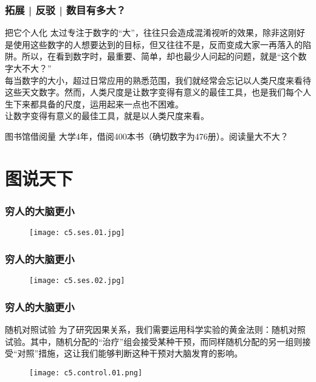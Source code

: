 \begin{frame}
  \frametitle{拓展 | 反驳 | 数目有多大？}
  \begin{block}{把它个人化}
  太过专注于数字的“大”，往往只会造成混淆视听的效果，除非这刚好是使用这些数字的人想要达到的目标，但又往往不是，反而变成大家一再落入的陷阱。所以，在看到数字时，最重要、简单，却也最少人问起的问题，就是“这个数字大不大？”\\
  \vspace{0.5em}
  每当数字的大小，超过日常应用的熟悉范围，我们就经常会忘记以人类尺度来看待这些天文数字。然而，\alert{人类尺度是让数字变得有意义的最佳工具}，也是我们每个人生下来都具备的尺度，运用起来一点也不困难。\\
  \vspace{0.5em}
  \alert{让数字变得有意义的最佳工具，就是以人类尺度来看。}
  \end{block}
  \pause
  \begin{block}{图书馆借阅量}
    大学4年，借阅400本书（确切数字为476册）。阅读量大不大？
  \end{block}
\end{frame}

\section{图说天下}
\begin{frame}
  \frametitle{穷人的大脑更小}
  \begin{figure}
    \centering
    \texttt{[image: c5.ses.01.jpg]}
  \end{figure}
\end{frame}

\begin{frame}
  \frametitle{穷人的大脑更小}
  \begin{figure}
    \centering
    \texttt{[image: c5.ses.02.jpg]}
  \end{figure}
\end{frame}

\begin{frame}
  \frametitle{穷人的大脑更小}
  \begin{block}{随机对照试验}
为了研究因果关系，我们需要运用科学实验的黄金法则：随机对照试验。其中，随机分配的“治疗”组会接受某种干预，而同样随机分配的另一组则接受“对照”措施，这让我们能够判断这种干预对大脑发育的影响。
  \end{block}
  \begin{figure}
    \centering
    \texttt{[image: c5.control.01.png]}
  \end{figure}
\end{frame}

